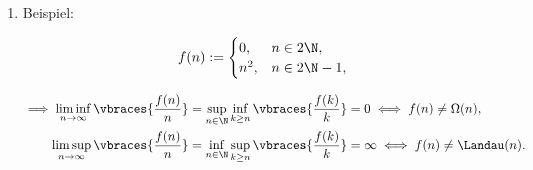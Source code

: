 \begin{solution}
\begin{enumerate}[label = (\alph*)]
  \item Beispiel:

  \begin{align*}
    f(n)
    :=
    \begin{cases}
      0,   & n \in 2 \N, \\
      n^2, & n \in 2 \N - 1,
    \end{cases}
  \end{align*}

  \begin{align*}
    \implies
    \liminf_{n \to \infty}
    \vbraces
    {
      \frac{f(n)}{n}
    }
    & =
    \sup_{n \in \N}
    \inf_{k \geq n}
    \vbraces
    {
      \frac{f(k)}{k}
    }
    =
    0
    \iff
    f(n) \neq \Omega(n), \\
    \limsup_{n \to \infty}
    \vbraces
    {
      \frac{f(n)}{n}
    }
    & =
    \inf_{n \in \N}
    \sup_{k \geq n}
    \vbraces
    {
      \frac{f(k)}{k}
    }
    =
    \infty
    \iff
    f(n) \neq \Landau(n).
  \end{align*}

\end{enumerate}

\end{solution}

